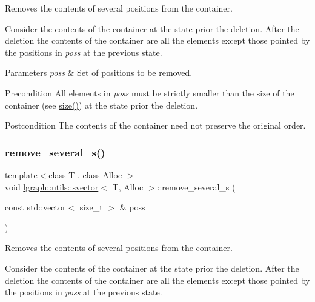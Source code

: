 Removes the contents of several positions from the container. 

Consider the contents of the container at the state prior the deletion. After the deletion the contents of the container are all the elements except those pointed by the positions in {\itshape poss} at the previous state.


\begin{DoxyParams}{Parameters}
{\em poss} & Set of positions to be removed. \\
\hline
\end{DoxyParams}
\begin{DoxyPrecond}{Precondition}
All elements in {\itshape poss} must be strictly smaller than the size of the container (see \hyperlink{classlgraph_1_1utils_1_1svector_af099aed6d134ad4c934be1339e4cf98c}{size()}) at the state prior the deletion. 
\end{DoxyPrecond}
\begin{DoxyPostcond}{Postcondition}
The contents of the container need not preserve the original order. 
\end{DoxyPostcond}
\mbox{\label{classlgraph_1_1utils_1_1svector_a2b3c8a4fcd5234fbe2e05bb36d406b01}} 
\subsubsection{\texorpdfstring{remove\+\_\+several\+\_\+s()}{remove\_several\_s()}}
{\footnotesize\ttfamily template$<$class T , class Alloc $>$ \\
void \hyperlink{classlgraph_1_1utils_1_1svector}{lgraph\+::utils\+::svector}$<$ T, Alloc $>$\+::remove\+\_\+several\+\_\+s (\begin{DoxyParamCaption}\item[{const std\+::vector$<$ size\+\_\+t $>$ \&}]{poss }\end{DoxyParamCaption})}



Removes the contents of several positions from the container. 

Consider the contents of the container at the state prior the deletion. After the deletion the contents of the container are all the elements except those pointed by the positions in {\itshape poss} at the previous state.


